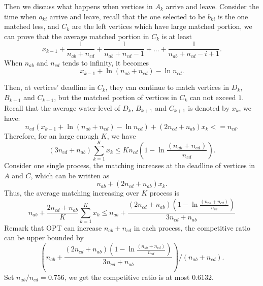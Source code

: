 Then we discuss what happens when vertices in $A_k$ arrive and leave. Consider the time when $a_{ki}$ arrive and leave, recall that the one selected to be $b_{ki}$ is the one matched less, and $C_k$ are the left vertices which have large matched portion, we can prove that the average matched portion in $C_k$ is at least 
$$
    x_{k-1} + \frac{1}{n_{ab} + n_{cd}} + \frac{1}{n_{ab}+n_{cd}-1} + ... + \frac{1}{n_{ab} +n_{cd}-i+1}.
$$
When $n_{ab}$ and $n_{cd}$ tends to infinity, it becomes
$$
    x_{k-1} + \ln (n_{ab} + n_{cd}) - \ln n_{cd}.
$$


Then, at vertices' deadline in $C_k$, they can continue to match vertices in $D_k$, $B_{k+1}$ and $C_{k+1}$, but the matched portion of vertices in $C_k$ can not exceed $1$. Recall that the average water-level of $D_k$, $B_{k+1}$ and $C_{k+1}$ is denoted by $x_k$, we have: 
$$
    n_{cd} (x_{k-1} + \ln (n_{ab} + n_{cd}) - \ln n_{cd}) + (2n_{cd} + n_{ab}) x_k <= n_{cd}.
$$
Therefore, for an large enough $K$, we have
$$
    (3n_{cd} + n_{ab})\sum_{k=1}^K x_{k}  \leq K n_{cd} (1-\ln \frac{(n_{ab}+n_{cd})}{n_{cd}} ). 
$$
Consider one single process, the matching increases at the deadline of vertices in $A$ and $C$, which can be written as
$$
    n_{ab} +  (2n_{cd} + n_{ab}) x_k.
$$
Thus, the average matching increasing over $K$ process is
$$
n_{ab} + \frac{2n_{cd} + n_{ab}}{K} \sum_{k=1}^{K} x_k \leq n_{ab} + \frac{(2n_{cd} + n_{ab})(1-\ln \frac{(n_{ab}+n_{cd})}{n_{cd}})}{3n_{cd} + n_{ab}}
$$
Remark that OPT can increase $n_{ab} + n_{cd}$ in each process, the competitive ratio can be upper bounded by
$$
(n_{ab} + \frac{(2n_{cd} + n_{ab})(1-\ln \frac{(n_{ab}+n_{cd})}{n_{cd}})}{3n_{cd} + n_{ab}})/(n_{ab}+n_{cd}).
$$
Set $n_{ab}/n_{cd} = 0.756$, we get the competitive ratio is at most $0.6132$.
